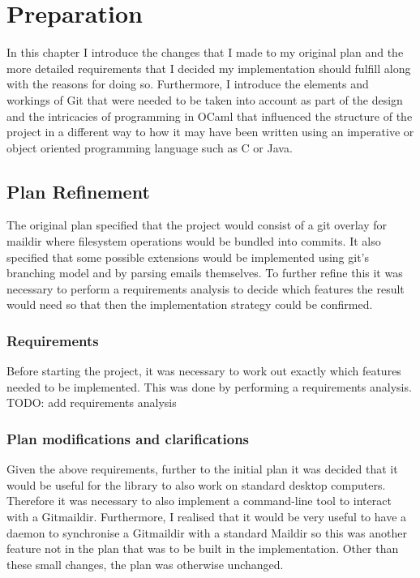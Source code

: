 \chapter{Preparation}

In this chapter I introduce the changes that I made to my original plan and the more detailed requirements that I decided my implementation should fulfill along with the reasons for doing so. Furthermore, I introduce the elements and workings of Git that were needed to be taken into account as part of the design and the intricacies of programming in OCaml that influenced the structure of the project in a different way to how it may have been written using an imperative or object oriented programming language such as C or Java.

\section{Plan Refinement}

The original plan specified that the project would consist of a git overlay for maildir where filesystem operations would be bundled into commits. It also specified that some possible extensions would be implemented using git's branching model and by parsing emails themselves. To further refine this it was necessary to perform a requirements analysis to decide which features the result would need so that then the implementation strategy could be confirmed.

\subsection{Requirements}

Before starting the project, it was necessary to work out exactly which features needed to be implemented. This was done by performing a requirements analysis. TODO: add requirements analysis

\subsection{Plan modifications and clarifications}

Given the above requirements, further to the initial plan it was decided that it would be useful for the library to also work on standard desktop computers. Therefore it was necessary to also implement a command-line tool to interact with a Gitmaildir. Furthermore, I realised that it would be very useful to have a daemon to synchronise a Gitmaildir with a standard Maildir so this was another feature not in the plan that was to be built in the implementation. Other than these small changes, the plan was otherwise unchanged.

